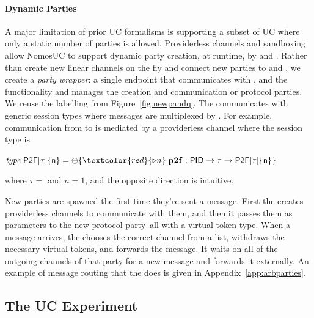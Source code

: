 \paragraph*{\textbf{Dynamic Parties}}
A major limitation of prior UC formalisms is supporting a subset of UC where only a static number of parties is allowed.
Providerless channels and sandboxing allow NomosUC to support dynamic party creation, at runtime, by \Z and \A.
Rather than create new linear channels on the fly and connect new parties to \Z and \A, we create a \emph{party wrapper}: a single endpoint that communicates with \Z, \A and the functionality and manages the creation and communication or protocol parties.
We reuse the labelling from Figure~\ref{fig:newpandq}.
The \partywrapper communicates with generic session types where messages are multiplexed by .
For example, communication from \partywrapper to \Fdb is mediated by a providerless channel where the session type is
\begin{tabbing}
	$\mi{type} \; \m{P2F[\tau]\{n\}} = \ichoice{\textcolor{red}{\paypot{n}} \; \mb{p2f}: \m{PID} \arrow \m{\tau} \arrow \m{P2F[\tau]\{n\}}}$
\end{tabbing}
where $\tau =$  and $n = 1$, and the opposite direction is intuitive. 

New parties are spawned the first time they're sent a message.
First the \partywrapper creates providerless channels to communicate with them, and then it passes them as parameters to the new protocol party--all with a virtual token type.
When a message arrives, the \partywrapper chooses the correct channel from a list, withdraws the necessary virtual tokens, and forwards the message.
It waits on all of the outgoing channels of that party for a new message and forwards it externally.
An example of message routing that the \partywrapper does is given in Appendix~\ref{app:arbparties}.

\subsection{The UC Experiment}

